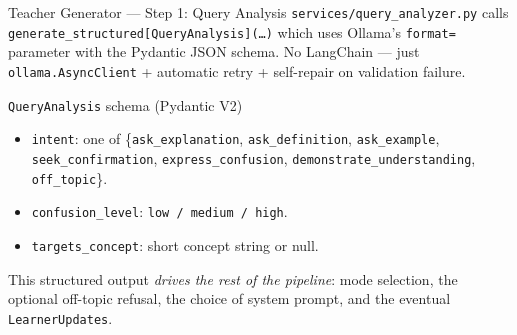 \documentclass[aspectratio=169, 10pt]{beamer}
\begin{document}
\begin{frame}{Teacher Generator --- Step 1: Query Analysis}
  \scriptsize
  \texttt{services/query\_analyzer.py} calls
  \texttt{generate\_structured[QueryAnalysis](\dots)} which uses
  Ollama's \texttt{format=} parameter with the Pydantic JSON schema.
  No LangChain --- just \texttt{ollama.AsyncClient} + automatic
  retry + self-repair on validation failure.

  \begin{block}{\texttt{QueryAnalysis} schema (Pydantic V2)}
    \scriptsize
    \begin{itemize}
      \setlength\itemsep{0pt}
      \item \texttt{intent}: one of \{\texttt{ask\_explanation},
            \texttt{ask\_definition}, \texttt{ask\_example},
            \texttt{seek\_confirmation}, \texttt{express\_confusion},
            \texttt{demonstrate\_understanding}, \texttt{off\_topic}\}.
      \item \texttt{confusion\_level}: \texttt{low / medium / high}.
      \item \texttt{targets\_concept}: short concept string or null.
    \end{itemize}
  \end{block}

  This structured output \emph{drives the rest of the pipeline}: mode
  selection, the optional off-topic refusal, the choice of system
  prompt, and the eventual \texttt{LearnerUpdates}.
\end{frame}
\end{document}

